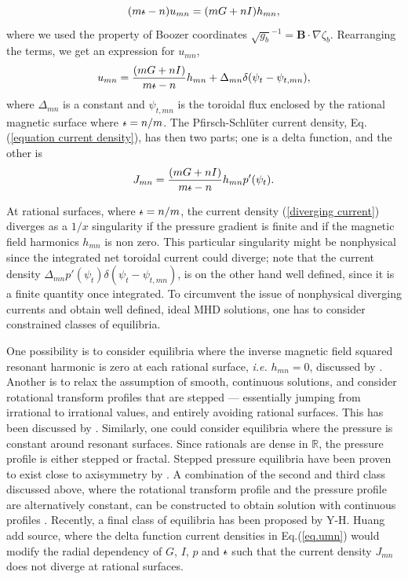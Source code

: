 \documentclass[my_thesis.tex]{subfiles}
\begin{document}
\begin{equation}
	(m\text{$\iota\!\!$-} - n)u_{mn} = (mG + nI)h_{mn},
\end{equation}
where we used the property of Boozer coordinates $\sqrt{g_b}^{-1}=\mathbf{B}\cdot\nabla\zeta_b$. Rearranging the terms, we get an expression for $u_{mn}$,
\begin{equation}
	u_{mn} = \frac{(mG + nI)}{m\text{$\iota\!\!$-} - n}h_{mn} + \Delta_{mn}\delta(\psi_t-\psi_{t,mn}),\label{eq.umn}
\end{equation}
where $\Delta_{mn}$ is a constant and $\psi_{t,mn}$ is the toroidal flux enclosed by the rational magnetic surface where $\text{$\iota\!\!$-}=n/m$. The Pfirsch-Schl\"uter current density, Eq.(\ref{equation current density}), has then two parts; one is a delta function, and the other is
\begin{equation}
	J_{mn} = \frac{(mG + nI)}{m\text{$\iota\!\!$-} - n}h_{mn}p'(\psi_t).\label{diverging current}
\end{equation}

At rational surfaces, where $\text{$\iota\!\!$-}=n/m$, the current density (\ref{diverging current}) diverges as a $1/x$ singularity if the pressure gradient is finite and if the magnetic field harmonics $h_{mn}$ is non zero. This particular singularity might be nonphysical since the integrated net toroidal current could diverge; note that the current density $\Delta_{mn} p'(\psi_t) \delta(\psi_t-\psi_{t,mn})$, is on the other hand well defined, since it is a finite quantity once integrated. To circumvent the issue of nonphysical diverging currents and obtain well defined, ideal MHD solutions, one has to consider constrained classes of equilibria.

One possibility is to consider equilibria where the inverse magnetic field squared resonant harmonic is zero at each rational surface, \emph{i.e.} $h_{mn}=0$, discussed by \citet{Weitzner2014}. Another is to relax the assumption of smooth, continuous solutions, and consider rotational transform profiles that are stepped --- essentially jumping from irrational to irrational values, and entirely avoiding rational surfaces. This has been discussed by \citet{Loizu2015a}. Similarly, one could consider equilibria where the pressure is constant around resonant surfaces. Since rationals are dense in $\mathbb{R}$, the pressure profile is either stepped or fractal. Stepped pressure equilibria have been proven to exist close to axisymmetry by \citet{Bruno1996}. A combination of the second and third class discussed above, where the rotational transform profile and the pressure profile are alternatively constant, can be constructed to obtain solution with continuous profiles \citep{Hudson2017a}. Recently, a final class of equilibria has been proposed by Y-H. Huang {\color{red} add source}, where the delta function current densities in Eq.(\ref{eq.umn}) would modify the radial dependency of $G$, $I$, $p$ and $\text{$\iota\!\!$-}$ such that the current density $J_{mn}$ does not diverge at rational surfaces.
\end{document}
